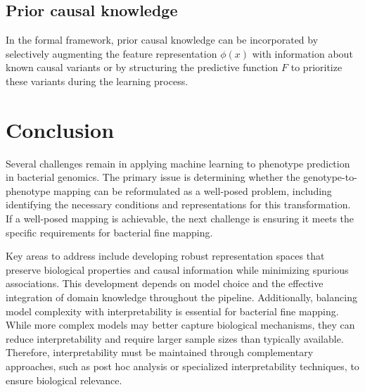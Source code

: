 \documentclass[12pt]{article}
\begin{document}
\subsection{Prior causal knowledge}

In the formal framework, prior causal knowledge can be incorporated by selectively augmenting the feature representation $\phi(x)$ with information about known causal variants or by structuring the predictive function $F$ to prioritize these variants during the learning process. 



\section{Conclusion} 

Several challenges remain in applying machine learning to phenotype prediction in bacterial genomics. The primary issue is determining whether the genotype-to-phenotype mapping can be reformulated as a well-posed problem, including identifying the necessary conditions and representations for this transformation. If a well-posed mapping is achievable, the next challenge is ensuring it meets the specific requirements for bacterial fine mapping.

Key areas to address include developing robust representation spaces that preserve biological properties and causal information while minimizing spurious associations. This development depends on model choice and the effective integration of domain knowledge throughout the pipeline. Additionally, balancing model complexity with interpretability is essential for bacterial fine mapping. While more complex models may better capture biological mechanisms, they can reduce interpretability and require larger sample sizes than typically available. Therefore, interpretability must be maintained through complementary approaches, such as post hoc analysis or specialized interpretability techniques, to ensure biological relevance.




%
%



% 



\end{document}
